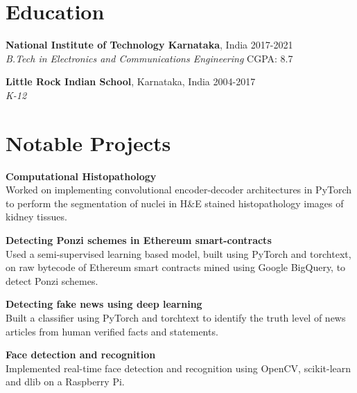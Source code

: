 \documentclass[margin]{res}
\begin{document}
  \address{National Institute of Technology\\
           Karnataka, India\\
           russel.171ec143@nitk.edu.in}
  \address{{\faMobile} (91+) 9611212081\\
           {\faLinkedin} \href{https://linkedin.com/in/rshwndsz}{linkedin.com/in/rshwndsz}\\
           {\faGithub} \href{https://github.com/rshwndsz}{github.com/rshwndsz}}


  \begin{resume}
    \section{Education}
      \textbf{National Institute of Technology Karnataka}, India\hfill
      2017-2021 \\
      {\sl B.Tech in Electronics and Communications Engineering}
      \hfill{CGPA: 8.7}

      \textbf{Little Rock Indian School}, Karnataka, India\hfill
      2004-2017 \\
      {\sl K-12}


    \section{Notable Projects}
      \par
      \textbf{Computational Histopathology}\\
      Worked on implementing convolutional encoder-decoder architectures in PyTorch to perform the segmentation of nuclei in H\&E stained histopathology images of kidney tissues.

      \par
      \textbf{Detecting Ponzi schemes in Ethereum smart-contracts}\\
      Used a semi-supervised learning based model, built using PyTorch and torchtext, on raw bytecode of Ethereum smart contracts mined using Google BigQuery, to detect Ponzi schemes.

      \par
      \textbf{Detecting fake news using deep learning}\\
      Built a classifier using PyTorch and torchtext to identify the truth level of news articles from human verified facts and statements.

      \par
      \textbf{Face detection and recognition}\\
      Implemented real-time face detection and recognition using OpenCV, scikit-learn and dlib on a Raspberry Pi.



\end{resume}
\end{document}
